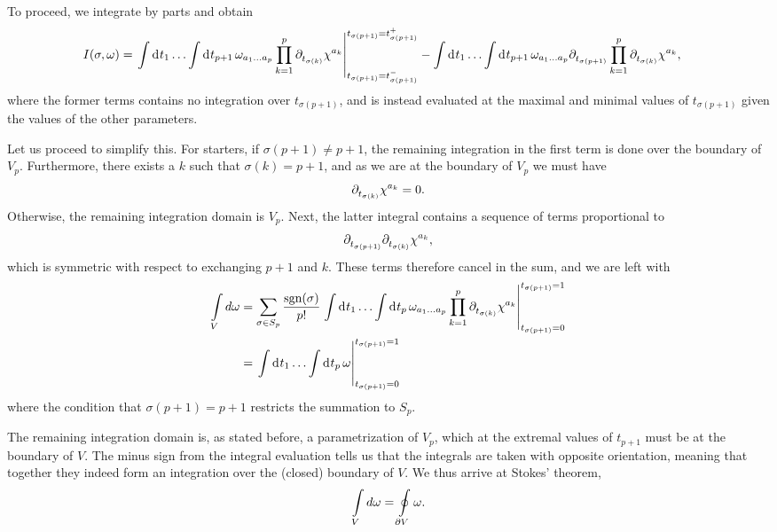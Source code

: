 To proceed, we integrate by parts and obtain
\begin{align*}
I(\sigma, \omega) &= \eval{\integ{}{}{t_{1}}{\dots \integ{}{}{t_{p + 1}}{\omega_{a_{1}\dots a_{p}}\prod\limits_{k = 1}^{p}\del{t_{\sigma(k)}}{\chi^{a_{k}}}}}}_{t_{\sigma(p + 1)} = t_{\sigma(p + 1)}^{-}}^{t_{\sigma(p + 1)} = t_{\sigma(p + 1)}^{+}} - \integ{}{}{t_{1}}{\dots \integ{}{}{t_{p + 1}}{\omega_{a_{1}\dots a_{p}}\del{t_{\sigma(p + 1)}}{\prod\limits_{k = 1}^{p}\del{t_{\sigma(k)}}{\chi^{a_{k}}}}}},
\end{align*}
where the former terms contains no integration over $t_{\sigma(p + 1)}$, and is instead evaluated at the maximal and minimal values of $t_{\sigma(p + 1)}$ given the values of the other parameters.

Let us proceed to simplify this. For starters, if $\sigma(p + 1) \neq p + 1$, the remaining integration in the first term is done over the boundary of $V_{p}$. Furthermore, there exists a $k$ such that $\sigma(k) = p + 1$, and as we are at the boundary of $V_{p}$ we must have
\begin{align*}
\partial^{}_{t_{\sigma(k)}}\chi^{a_{k}} = 0.
\end{align*}
Otherwise, the remaining integration domain is $V_{p}$. Next, the latter integral contains a sequence of terms proportional to
\begin{align*}
\partial^{}_{t_{\sigma(p + 1)}}\partial^{}_{t_{\sigma(k)}}\chi^{a_{k}},
\end{align*}
which is symmetric with respect to exchanging $p + 1$ and $k$. These terms therefore cancel in the sum, and we are left with
\begin{align*}
\minteg{V}{d\omega} &= \sum\limits_{\sigma\in S_{p}}\frac{\text{sgn}(\sigma)}{p!}\eval{\integ{}{}{t_{1}}{\dots \integ{}{}{t_{p}}{\omega_{a_{1}\dots a_{p}}\prod\limits_{k = 1}^{p}\del{t_{\sigma(k)}}{\chi^{a_{k}}}}}}_{t_{\sigma(p + 1)} = 0}^{t_{\sigma(p + 1)} = 1} \\
&= \eval{\integ{}{}{t_{1}}{\dots \integ{}{}{t_{p}}{\omega}}}_{t_{\sigma(p + 1)} = 0}^{t_{\sigma(p + 1)} = 1}
\end{align*}
where the condition that $\sigma(p + 1) = p + 1$ restricts the summation to $S_{p}$.

The remaining integration domain is, as stated before, a parametrization of $V_{p}$, which at the extremal values of $t_{p + 1}$ must be at the boundary of $V$. The minus sign from the integral evaluation tells us that the integrals are taken with opposite orientation, meaning that together they indeed form an integration over the (closed) boundary of $V$. We thus arrive at Stokes' theorem,
\begin{align*}
\int\limits_{V}d\omega = \oint\limits_{\partial V}\omega.
\end{align*}

